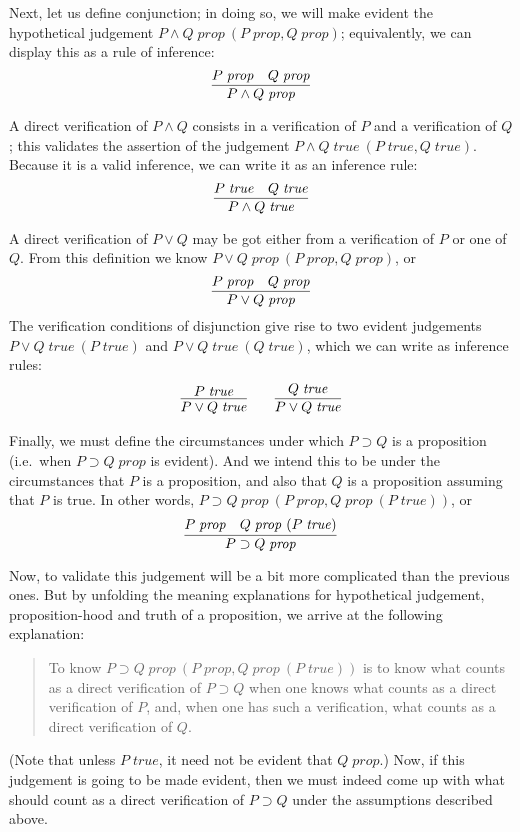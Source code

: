 \documentclass{amsart}
\theoremstyle{definition}
\theoremstyle{remark}
\numberwithin{equation}{section}
\newcommand\isprop[1]{\ensuremath{#1\;\mathit{prop}}}
\newcommand\istrue[1]{\ensuremath{#1\;\mathit{true}}}
\newcommand\hyp[2]{\ensuremath{#1\ (#2)}}
\begin{document}
Next, let us define conjunction; in doing so, we will make evident the
hypothetical judgement \hyp{\isprop{P\land Q}}{\isprop{P},\isprop{Q}};
equivalently, we can display this as a rule of inference:
\[
  \infer{
    \isprop{P\land Q}
  }{
    \isprop{P} &
    \isprop{Q}
  }
\]

A direct verification of $P\land Q$ consists in a verification of $P$
and a verification of $Q$; this validates the assertion of the judgement
\hyp{\istrue{P\land Q}}{\istrue{P},\istrue{Q}}. Because it is a valid
inference, we can write it as an inference rule:
\[
  \infer{
    \istrue{P\land Q}
  }{
    \istrue{P} &
    \istrue{Q}
  }
\]

A direct verification of $P\lor Q$ may be got either from a verification
of $P$ or one of $Q$. From this definition we know \hyp{\isprop{P\lor
Q}}{\isprop{P},\isprop{Q}}, or
\[
  \infer{
    \isprop{P\lor Q}
  }{
    \isprop{P} &
    \isprop{Q}
  }
\]
The verification conditions of disjunction give
rise to two evident judgements \hyp{\istrue{P\lor Q}}{\istrue{P}} and
\hyp{\istrue{P\lor Q}}{\istrue{Q}}, which we can write as inference rules:
\begin{gather*}
  \infer{
    \istrue{P\lor Q}
  }{
    \istrue{P}
  }
  \qquad
  \infer{
    \istrue{P\lor Q}
  }{
    \istrue{Q}
  }
\end{gather*}

Finally, we must define the circumstances under which $P\supset Q$ is a
proposition (i.e.\ when \isprop{P\supset Q} is evident). And we intend this to
be under the circumstances that $P$ is a proposition, and also that $Q$ is a
proposition assuming that $P$ is true. In other words, \hyp{\isprop{P\supset
Q}}{\isprop{P}, \hyp{\isprop{Q}}{\istrue{P}}}, or
\[
  \infer{
    \isprop{P\supset Q}
  }{
    \isprop{P} &
    \hyp{\isprop{Q}}{\istrue{P}}
  }
\]

Now, to validate this judgement will be a bit more complicated than the
previous ones. But by unfolding the meaning explanations for hypothetical
judgement, proposition-hood and truth of a proposition, we arrive at the
following explanation:
\begin{quote}
  To know \hyp{\isprop{P\supset Q}}{\isprop{P},\hyp{\isprop{Q}}{\istrue{P}}} is
  to know what counts as a direct verification of $P\supset Q$ when one knows what
  counts as a direct verification of $P$, and, when one has such a verification, what
  counts as a direct verification of $Q$.
\end{quote}

(Note that unless \istrue{P}, it need not be evident that \isprop{Q}.) Now, if
this judgement is going to be made evident, then we must indeed come up with
what should count as a direct verification of $P\supset Q$ under the
assumptions described above.
\end{document}
